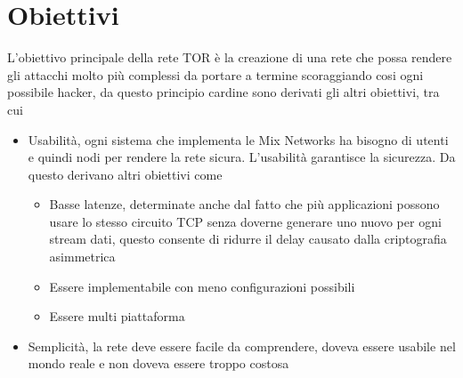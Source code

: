 \newpage
\section{Obiettivi}
L'obiettivo principale della rete TOR è la creazione di una rete che possa rendere gli attacchi molto più complessi da portare a termine scoraggiando cosi ogni possibile hacker, da questo principio cardine sono derivati gli altri obiettivi, tra cui
\begin{itemize}
    \item Usabilità, ogni sistema che implementa le Mix Networks ha bisogno di utenti e quindi nodi per rendere la rete sicura. L'usabilità garantisce la sicurezza. Da questo derivano altri obiettivi come
    \begin{itemize}
        \item Basse latenze, determinate anche dal fatto che più applicazioni possono usare lo stesso circuito TCP senza doverne generare uno nuovo per ogni stream dati, questo consente di ridurre il delay causato dalla criptografia asimmetrica
        \item Essere implementabile con meno configurazioni possibili
        \item Essere multi piattaforma
    \end{itemize}
    \item Semplicità, la rete deve essere facile da comprendere, doveva essere usabile nel mondo reale e non doveva essere troppo costosa
\end{itemize}

\cite{ChaumMixes}

